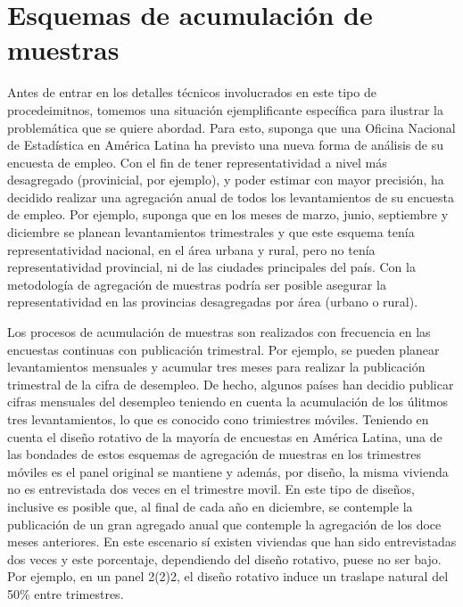 \hypertarget{esquemas-de-acumulacion-de-muestras}{%
\section{Esquemas de acumulación de muestras}\label{esquemas-de-acumulacion-de-muestras}}

Antes de entrar en los detalles técnicos involucrados en este tipo de procedeimitnos, tomemos una situación ejemplificante específica para ilustrar la problemática que se quiere abordad. Para esto, suponga que una Oficina Nacional de Estadística en América Latina ha previsto una nueva forma de análisis de su encuesta de empleo. Con el fin de tener representatividad a nivel más desagregado (provinicial, por ejemplo), y poder estimar con mayor precisión, ha decidido realizar una agregación anual de todos los levantamientos de su encuesta de empleo. Por ejemplo, suponga que en los meses de marzo, junio, septiembre y diciembre se planean levantamientos trimestrales y que este esquema tenía representatividad nacional, en el área urbana y rural, pero no tenía representatividad provincial, ni de las ciudades principales del país. Con la metodología de agregación de muestras podría ser posible asegurar la representatividad en las provincias desagregadas por área (urbano o rural).

Los procesos de acumulación de muestras son realizados con frecuencia en las encuestas continuas con publicación trimestral. Por ejemplo, se pueden planear levantamientos mensuales y acumular tres meses para realizar la publicación trimestral de la cifra de desempleo. De hecho, algunos países han decidio publicar cifras mensuales del desempleo teniendo en cuenta la acumulación de los úlitmos tres levantamientos, lo que es conocido cono trimiestres móviles. Teniendo en cuenta el diseño rotativo de la mayoría de encuestas en América Latina, una de las bondades de estos esquemas de agregación de muestras en los trimestres móviles es el panel original se mantiene y además, por diseño, la misma vivienda no es entrevistada dos veces en el trimestre movil. En este tipo de diseños, inclusive es posible que, al final de cada año en diciembre, se contemple la publicación de un gran agregado anual que contemple la agregación de los doce meses anteriores. En este escenario sí existen viviendas que han sido entrevistadas dos veces y este porcentaje, dependiendo del diseño rotativo, puese no ser bajo. Por ejemplo, en un panel 2(2)2, el diseño rotativo induce un traslape natural del 50\% entre trimestres.

